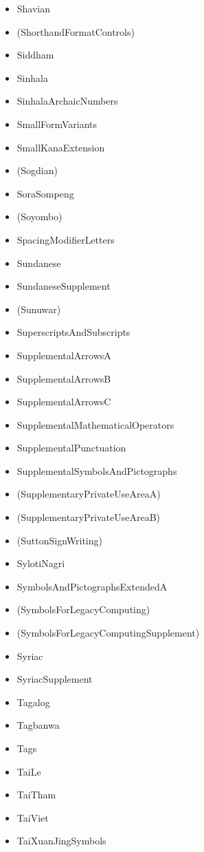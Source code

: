\documentclass{article}
\newenvironment{itemlist}{%
  \begin{itemize}
  \setlength{\itemsep}{0pt}
  \setlength{\parsep}{0pt}
  \setlength{\topsep}{0pt}
  \setlength{\partopsep}{0pt}
  \setlength{\parskip}{0pt}
  \setlength{\labelsep}{5pt}}%
{
  \end{itemize}}
\begin{document}
\begin{multicols*}{2}
\begin{itemlist}
        \item Shavian
        \item (ShorthandFormatControls)
        \item Siddham
        \item Sinhala
        \item SinhalaArchaicNumbers
        \item SmallFormVariants
        \item SmallKanaExtension
        \item (Sogdian)
        \item SoraSompeng
        \item (Soyombo)
        \item SpacingModifierLetters
        \item Sundanese
        \item SundaneseSupplement
        \item (Sunuwar)
        \item SuperscriptsAndSubscripts
        \item SupplementalArrowsA
        \item SupplementalArrowsB
        \item SupplementalArrowsC
        \item SupplementalMathematicalOperators
        \item SupplementalPunctuation
        \item SupplementalSymbolsAndPictographs
        \item (SupplementaryPrivateUseAreaA)
        \item (SupplementaryPrivateUseAreaB)
        \item (SuttonSignWriting)
        \item SylotiNagri
        \item SymbolsAndPictographsExtendedA
        \item (SymbolsForLegacyComputing)
        \item (SymbolsForLegacyComputingSupplement)
        \item Syriac
        \item SyriacSupplement
        \item Tagalog
        \item Tagbanwa
        \item Tags
        \item TaiLe
        \item TaiTham
        \item TaiViet
        \item TaiXuanJingSymbols

\end{itemlist}
\end{multicols*}
\end{document}
